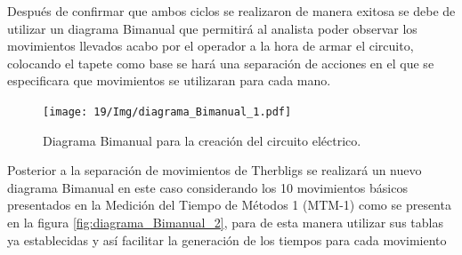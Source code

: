     Después de confirmar que ambos ciclos se realizaron de manera exitosa se debe de utilizar un diagrama Bimanual que permitirá al analista poder observar los movimientos llevados acabo por el operador a la hora de armar el circuito, colocando el tapete como base se hará una separación de acciones en el que se especificara que movimientos se utilizaran para cada mano.

    \begin{figure}[H]
        \centering
        \texttt{[image: 19/Img/diagrama\_Bimanual\_1.pdf]}
        \newpage
        \caption{Diagrama Bimanual para la creación del circuito eléctrico.}
        \label{fig:diagrama_Bimanual_1}
    \end{figure}

    Posterior a la separación de movimientos de Therbligs se realizará un nuevo diagrama Bimanual en este caso considerando los 10 movimientos básicos presentados en la Medición del Tiempo de Métodos 1 (MTM-1) como se presenta en la figura \ref{fig:diagrama_Bimanual_2}, para de esta manera utilizar sus tablas ya establecidas y así facilitar la generación de los tiempos para cada movimiento 
